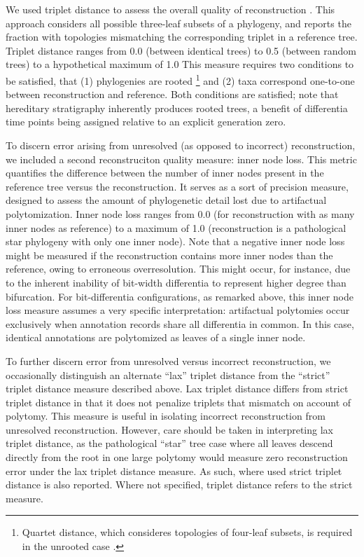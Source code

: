 We used triplet distance to assess the overall quality of reconstruction \citep{critchlow1996triples}.
This approach considers all possible three-leaf subsets of a phylogeny, and reports the fraction with topologies mismatching the corresponding triplet in a reference tree.
Triplet distance ranges from 0.0 (between identical trees) to 0.5 (between random trees) to a hypothetical maximum of 1.0
This measure requires two conditions to be satisfied, that (1) phylogenies are rooted%
\footnote{Quartet distance, which consideres topologies of four-leaf subsets, is required in the unrooted case \citep{estabrook1985comparison}.}
and (2) taxa correspond one-to-one between reconstruction and reference.
Both conditions are satisfied; note that hereditary stratigraphy inherently produces rooted trees, a benefit of differentia time points being assigned relative to an explicit generation zero.

To discern error arising from unresolved (as opposed to incorrect) reconstruction, we included a second reconstruciton quality measure: inner node loss.
This metric quantifies the difference between the number of inner nodes present in the reference tree versus the reconstruction.
It serves as a sort of precision measure, designed to assess the amount of phylogenetic detail lost due to artifactual polytomization.
Inner node loss ranges from 0.0 (for reconstruction with as many inner nodes as reference) to a maximum of 1.0 (reconstruction is a pathological star phylogeny with only one inner node).
Note that a negative inner node loss might be measured if the reconstruction contains more inner nodes than the reference, owing to erroneous overresolution.
This might occur, for instance, due to the inherent inability of bit-width differentia to represent higher degree than bifurcation.
For bit-differentia configurations, as remarked above, this inner node loss measure assumes a very specific interpretation: artifactual polytomies occur exclusively when annotation records share all differentia in common.
In this case, identical annotations are polytomized as leaves of a single inner node.

To further discern error from unresolved versus incorrect reconstruction, we occasionally distinguish an alternate ``lax'' triplet distance from the ``strict'' triplet distance measure described above.
Lax triplet distance differs from strict triplet distance in that it does not penalize triplets that mismatch on account of polytomy.
This measure is useful in isolating incorrect reconstruction from unresolved reconstruction.
However, care should be taken in interpreting lax triplet distance, as the pathological ``star'' tree case where all leaves descend directly from the root in one large polytomy would measure zero reconstruction error under the lax triplet distance measure.
As such, where used strict triplet distance is also reported.
Where not specified, triplet distance refers to the strict measure.


